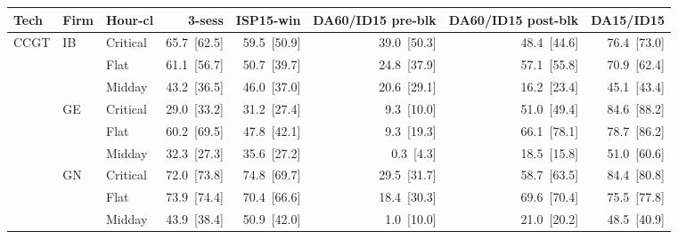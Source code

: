 \begin{tabular}{l l l r r r r r}
\toprule
Tech & Firm & Hour-cl & 3-sess & ISP15-win & DA60/ID15 pre-blk & DA60/ID15 post-blk & DA15/ID15 \\
\midrule
CCGT & IB & Critical & 65.7~{\color{seasoncol}\scriptsize[62.5]} & 59.5~{\color{seasoncol}\scriptsize[50.9]} & 39.0~{\color{seasoncol}\scriptsize[50.3]} & 48.4~{\color{seasoncol}\scriptsize[44.6]} & 76.4~{\color{seasoncol}\scriptsize[73.0]} \\
 &  & Flat & 61.1~{\color{seasoncol}\scriptsize[56.7]} & 50.7~{\color{seasoncol}\scriptsize[39.7]} & 24.8~{\color{seasoncol}\scriptsize[37.9]} & 57.1~{\color{seasoncol}\scriptsize[55.8]} & 70.9~{\color{seasoncol}\scriptsize[62.4]} \\
 &  & Midday & 43.2~{\color{seasoncol}\scriptsize[36.5]} & 46.0~{\color{seasoncol}\scriptsize[37.0]} & 20.6~{\color{seasoncol}\scriptsize[29.1]} & 16.2~{\color{seasoncol}\scriptsize[23.4]} & 45.1~{\color{seasoncol}\scriptsize[43.4]} \\
 & GE & Critical & 29.0~{\color{seasoncol}\scriptsize[33.2]} & 31.2~{\color{seasoncol}\scriptsize[27.4]} & 9.3~{\color{seasoncol}\scriptsize[10.0]} & 51.0~{\color{seasoncol}\scriptsize[49.4]} & 84.6~{\color{seasoncol}\scriptsize[88.2]} \\
 &  & Flat & 60.2~{\color{seasoncol}\scriptsize[69.5]} & 47.8~{\color{seasoncol}\scriptsize[42.1]} & 9.3~{\color{seasoncol}\scriptsize[19.3]} & 66.1~{\color{seasoncol}\scriptsize[78.1]} & 78.7~{\color{seasoncol}\scriptsize[86.2]} \\
 &  & Midday & 32.3~{\color{seasoncol}\scriptsize[27.3]} & 35.6~{\color{seasoncol}\scriptsize[27.2]} & 0.3~{\color{seasoncol}\scriptsize[4.3]} & 18.5~{\color{seasoncol}\scriptsize[15.8]} & 51.0~{\color{seasoncol}\scriptsize[60.6]} \\
 & GN & Critical & 72.0~{\color{seasoncol}\scriptsize[73.8]} & 74.8~{\color{seasoncol}\scriptsize[69.7]} & 29.5~{\color{seasoncol}\scriptsize[31.7]} & 58.7~{\color{seasoncol}\scriptsize[63.5]} & 84.4~{\color{seasoncol}\scriptsize[80.8]} \\
 &  & Flat & 73.9~{\color{seasoncol}\scriptsize[74.4]} & 70.4~{\color{seasoncol}\scriptsize[66.6]} & 18.4~{\color{seasoncol}\scriptsize[30.3]} & 69.6~{\color{seasoncol}\scriptsize[70.4]} & 75.5~{\color{seasoncol}\scriptsize[77.8]} \\
 &  & Midday & 43.9~{\color{seasoncol}\scriptsize[38.4]} & 50.9~{\color{seasoncol}\scriptsize[42.0]} & 1.0~{\color{seasoncol}\scriptsize[10.0]} & 21.0~{\color{seasoncol}\scriptsize[20.2]} & 48.5~{\color{seasoncol}\scriptsize[40.9]} \\

\end{tabular}
